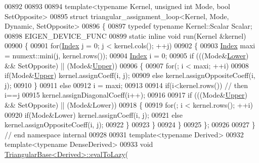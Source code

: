 \begin{DoxyCode}
00892 
00893 
00894 \textcolor{keyword}{template}<\textcolor{keyword}{typename} Kernel, \textcolor{keywordtype}{unsigned} \textcolor{keywordtype}{int} Mode, \textcolor{keywordtype}{bool} SetOpposite>
00895 \textcolor{keyword}{struct }triangular\_assignment\_loop<Kernel, Mode, Dynamic, SetOpposite>
00896 \{
00897   \textcolor{keyword}{typedef} \textcolor{keyword}{typename} Kernel::Scalar Scalar;
00898   EIGEN\_DEVICE\_FUNC
00899   \textcolor{keyword}{static} \textcolor{keyword}{inline} \textcolor{keywordtype}{void} run(Kernel &kernel)
00900   \{
00901     \textcolor{keywordflow}{for}(\hyperlink{group___core___module_a554f30542cc2316add4b1ea0a492ff02}{Index} j = 0; j < kernel.cols(); ++j)
00902     \{
00903       \hyperlink{group___core___module_a554f30542cc2316add4b1ea0a492ff02}{Index} maxi = numext::mini(j, kernel.rows());
00904       \hyperlink{group___core___module_a554f30542cc2316add4b1ea0a492ff02}{Index} i = 0;
00905       \textcolor{keywordflow}{if} (((Mode&\hyperlink{group__enums_gga39e3366ff5554d731e7dc8bb642f83cda891792b8ed394f7607ab16dd716f60e6}{Lower}) && SetOpposite) || (Mode&\hyperlink{group__enums_gga39e3366ff5554d731e7dc8bb642f83cda6bcb58be3b8b8ec84859ce0c5ac0aaec}{Upper}))
00906       \{
00907         \textcolor{keywordflow}{for}(; i < maxi; ++i)
00908           \textcolor{keywordflow}{if}(Mode&\hyperlink{group__enums_gga39e3366ff5554d731e7dc8bb642f83cda6bcb58be3b8b8ec84859ce0c5ac0aaec}{Upper}) kernel.assignCoeff(i, j);
00909           \textcolor{keywordflow}{else}           kernel.assignOppositeCoeff(i, j);
00910       \}
00911       \textcolor{keywordflow}{else}
00912         i = maxi;
00913       
00914       \textcolor{keywordflow}{if}(i<kernel.rows()) \textcolor{comment}{// then i==j}
00915         kernel.assignDiagonalCoeff(i++);
00916       
00917       \textcolor{keywordflow}{if} (((Mode&\hyperlink{group__enums_gga39e3366ff5554d731e7dc8bb642f83cda6bcb58be3b8b8ec84859ce0c5ac0aaec}{Upper}) && SetOpposite) || (Mode&Lower))
00918       \{
00919         \textcolor{keywordflow}{for}(; i < kernel.rows(); ++i)
00920           \textcolor{keywordflow}{if}(Mode&Lower) kernel.assignCoeff(i, j);
00921           \textcolor{keywordflow}{else}           kernel.assignOppositeCoeff(i, j);
00922       \}
00923     \}
00924   \}
00925 \};
00926 
00927 \} \textcolor{comment}{// end namespace internal}
00928 
00931 \textcolor{keyword}{template}<\textcolor{keyword}{typename} Derived>
00932 \textcolor{keyword}{template}<\textcolor{keyword}{typename} DenseDerived>
00933 \textcolor{keywordtype}{void} \hyperlink{group___core___module_class_eigen_1_1_triangular_base}{TriangularBase<Derived>::evalToLazy}(

\end{DoxyCode}
